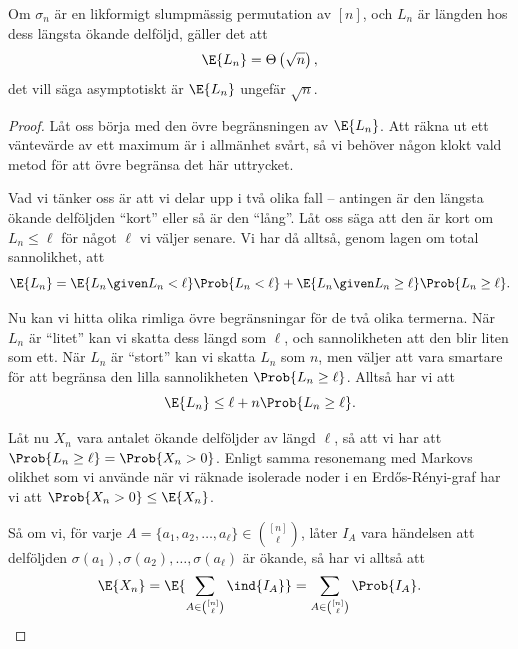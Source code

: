 \documentclass[nobib]{tufte-handout}
\begin{document}
\begin{theorem}
  Om $\sigma_n$ är en likformigt slumpmässig permutation av $[n]$, och $L_n$ är längden hos dess längsta ökande delföljd, gäller det att
  $$\E{L_n} = \Theta\left(\sqrt{n}\right),$$
  det vill säga asymptotiskt är $\E{L_n}$ ungefär $\sqrt{n}$.

  \begin{proof}
    Låt oss börja med den övre begränsningen av $\E{L_n}$. Att räkna ut ett väntevärde av ett maximum är i allmänhet svårt, så vi behöver någon klokt vald metod för att övre begränsa det här uttrycket.

    Vad vi tänker oss är att vi delar upp i två olika fall -- antingen är den längsta ökande delföljden ``kort'' eller så är den ``lång''. Låt oss säga att den är kort om $L_n \leq \ell$ för något $\ell$ vi väljer senare. Vi har då alltså, genom lagen om total sannolikhet, att
    $$\E{L_n} = \E{L_n \given L_n < \ell}\Prob{L_n < \ell} + \E{L_n \given L_n \geq \ell}\Prob{L_n \geq \ell}.$$

    Nu kan vi hitta olika rimliga övre begränsningar för de två olika termerna. När $L_n$ är ``litet'' kan vi skatta dess längd som $\ell$, och sannolikheten att den blir liten som ett. När $L_n$ är ``stort'' kan vi skatta $L_n$ som $n$, men väljer att vara smartare för att begränsa den lilla sannolikheten $\Prob{L_n \geq \ell}$. Alltså har vi att
    $$\E{L_n} \leq \ell + n \Prob{L_n \geq \ell}.$$

    Låt nu $X_n$ vara antalet ökande delföljder av längd $\ell$, så att vi har att $\Prob{L_n \geq \ell} = \Prob{X_n > 0}$. Enligt samma resonemang med Markovs olikhet som vi använde när vi räknade isolerade noder i en Erd\H{o}s-Rényi-graf har vi att $\Prob{X_n > 0} \leq \E{X_n}$.

    Så om vi, för varje $A = \{a_1, a_2, \ldots, a_\ell\}\in \binom{[n]}{\ell}$, låter $I_A$ vara händelsen att delföljden $\sigma(a_1), \sigma(a_2), \ldots, \sigma(a_\ell)$ är ökande, så har vi alltså att
    $$\E{X_n} = \E{\sum_{A \in \binom{[n]}{\ell}} \ind{I_A}} = \sum_{A \in \binom{[n]}{\ell}} \Prob{I_A}.$$


\end{proof}
\end{theorem}
\end{document}

